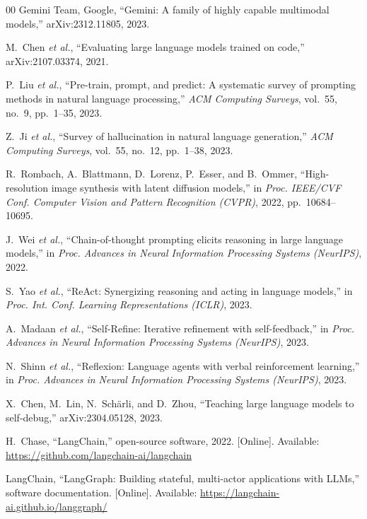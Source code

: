 \begin{thebibliography}{00}
 Gemini Team, Google, ``Gemini: A family of highly capable
multimodal models,'' arXiv:2312.11805, 2023.

 M.~Chen \emph{et al.}, ``Evaluating large language
models trained on code,'' arXiv:2107.03374, 2021.

 P.~Liu \emph{et al.}, ``Pre-train, prompt, and
predict: A systematic survey of prompting methods in natural language
processing,'' \emph{ACM Computing Surveys}, vol.~55, no.~9, pp.~1--35, 2023.

 Z.~Ji \emph{et al.}, ``Survey of hallucination in
natural language generation,'' \emph{ACM Computing Surveys}, vol.~55, no.~12,
pp.~1--38, 2023.

 R.~Rombach, A.~Blattmann, D.~Lorenz, P.~Esser, and
B.~Ommer, ``High-resolution image synthesis with latent diffusion models,'' in
\emph{Proc. IEEE/CVF Conf. Computer Vision and Pattern Recognition (CVPR)},
2022, pp.~10684--10695.

 J.~Wei \emph{et al.}, ``Chain-of-thought prompting elicits
reasoning in large language models,'' in \emph{Proc. Advances in Neural
Information Processing Systems (NeurIPS)}, 2022.

 S.~Yao \emph{et al.}, ``ReAct: Synergizing reasoning and
acting in language models,'' in \emph{Proc. Int. Conf. Learning Representations
(ICLR)}, 2023.

 A.~Madaan \emph{et al.}, ``Self-Refine: Iterative
refinement with self-feedback,'' in \emph{Proc. Advances in Neural Information
Processing Systems (NeurIPS)}, 2023.

 N.~Shinn \emph{et al.}, ``Reflexion: Language
agents with verbal reinforcement learning,'' in \emph{Proc. Advances in Neural
Information Processing Systems (NeurIPS)}, 2023.

 X.~Chen, M.~Lin, N.~Sch\"arli, and D.~Zhou,
``Teaching large language models to self-debug,'' arXiv:2304.05128, 2023.

 H.~Chase, ``LangChain,'' open-source software, 2022.
[Online]. Available: \url{https://github.com/langchain-ai/langchain}

 LangChain, ``LangGraph: Building stateful, multi-actor
applications with LLMs,'' software documentation. [Online]. Available:
\url{https://langchain-ai.github.io/langgraph/}


\end{thebibliography}
